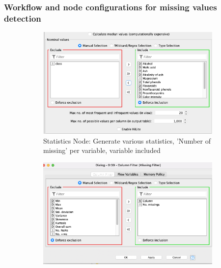 \documentclass[11pt]{article}
\begin{document}
			\subsubsection*{Workflow and node configurations for missing values detection}

			\iffalse
			\begin{figure}[H]
				\centering
				\begin{subfigure}{0.4\textwidth}
					\includegraphics[width=\textwidth]{res/t0/t01/t01-statistics-conf}
					\caption{Statistics Node: Generate various statistics, 'Number of missing' per variable, variable included}
					\label{fig:first}
				\end{subfigure}
				\hfill
				\begin{subfigure}{0.4\textwidth}
					\includegraphics[width=\textwidth]{res/t0/t01/t01-column-filter-conf}

\end{subfigure}
\end{figure}
\end{document}
